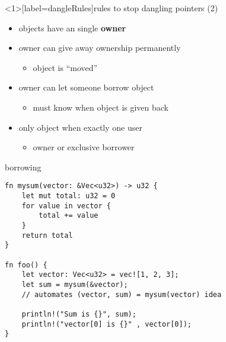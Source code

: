 \begin{frame}<1>[label=dangleRules]{rules to stop dangling pointers (2)}
    \begin{itemize}
    \item objects have an single \textbf{owner}
    \item owner can give away ownership permanently
        \begin{itemize}
        \item object is ``moved''
        \end{itemize}
    \item owner can let someone borrow object 
        \begin{itemize}
        \item must know when object is given back
        \end{itemize}
    \item only  object when exactly one user
        \begin{itemize}
        \item owner or exclusive borrower
        \end{itemize}
    \end{itemize}
\end{frame}

\begin{frame}[fragile,label=rustBorrowing1]{borrowing}
    \begin{verbatim}
fn mysum(vector: &Vec<u32>) -> u32 {
    let mut total: u32 = 0
    for value in vector {
        total += value
    }
    return total
}

fn foo() {
    let vector: Vec<u32> = vec![1, 2, 3];
    let sum = mysum(&vector);
    // automates (vector, sum) = mysum(vector) idea
    
    println!("Sum is {}", sum);
    println!("vector[0] is {}" , vector[0]);
}
\end{verbatim}
\end{frame}


